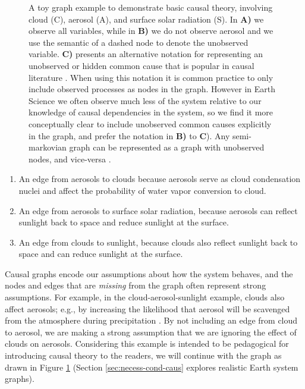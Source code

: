 \documentclass[12pt]{article}
\begin{document}
\begin{figure}
  \scalebox{1.0}{}
  \caption{A toy graph example to demonstrate basic causal theory,
    involving cloud (C), aerosol (A), and surface solar radiation
    (S). In \textbf{A)} we observe all variables, while in \textbf{B)}
    we do not observe aerosol and we use the semantic of a dashed node
    to denote the unobserved variable. \textbf{C)} presents an
    alternative notation for representing an unobserved or hidden
    common cause that is popular in causal literature \citep[e.g.,
    ``semi-markovian graphs'',][]{shpitser2006}. When using this
    notation it is common practice to only include observed processes
    as nodes in the graph. However in Earth Science we often observe
    much less of the system relative to our knowledge of causal
    dependencies in the system, so we find it more conceptually clear
    to include unobserved common causes explicitly in the graph, and
    prefer the notation in \textbf{B)} to \textbf{C}). Any
    semi-markovian graph can be represented as a graph with unobserved
    nodes, and vice-versa \citep[e.g.,][]{lee2019structural}.}
  \label{fig:toy}
\end{figure}

\begin{enumerate}
\item An edge from aerosols to clouds because aerosols serve as cloud
  condensation nuclei and affect the probability of water vapor
  conversion to cloud.
\item An edge from aerosols to surface solar radiation, because
  aerosols can reflect sunlight back to space and reduce sunlight
  at the surface.
\item An edge from clouds to sunlight, because clouds also reflect
  sunlight back to space and can reduce sunlight at the surface.
\end{enumerate}

Causal graphs encode our assumptions about how the system behaves, and
the nodes and edges that are \textit{missing} from the graph often
represent strong assumptions. For example, in the
cloud-aerosol-sunlight example, clouds also affect aerosols; e.g., by
increasing the likelihood that aerosol will be scavenged from the
atmosphere during precipitation \citep[e.g.,][]{radke-scavenge-1980,
  jurado2008, blanco-alegre2018}. By not including an edge from
cloud to aerosol, we are making a strong assumption that we are
ignoring the effect of clouds on aerosols. Considering this example is
intended to be pedagogical for introducing causal theory to the
readers, we will continue with the graph as drawn in Figure
\ref{fig:toy} (Section \ref{sec:necess-cond-caus} explores realistic
Earth system graphs).
\end{document}
